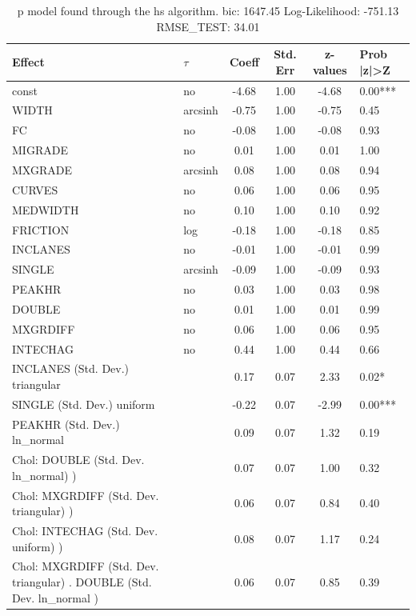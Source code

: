 \begin{table}
	\caption{p model found through the hs algorithm. bic: 1647.45 Log-Likelihood: -751.13 RMSE_TEST: 34.01}
	\begin{center}
		\begin{tabular}{|l|l|c|c|c|l|}
			\hline
			Effect & $\tau$ & Coeff & Std. Err & z-values & Prob |z|>Z \\
			\hline
			const & no & -4.68 & 1.00 & -4.68 & 0.00*** \\
			\hline
			WIDTH & arcsinh & -0.75 & 1.00 & -0.75 & 0.45 \\
			\hline
			FC & no & -0.08 & 1.00 & -0.08 & 0.93 \\
			\hline
			MIGRADE & no & 0.01 & 1.00 & 0.01 & 1.00 \\
			\hline
			MXGRADE & arcsinh & 0.08 & 1.00 & 0.08 & 0.94 \\
			\hline
			CURVES & no & 0.06 & 1.00 & 0.06 & 0.95 \\
			\hline
			MEDWIDTH & no & 0.10 & 1.00 & 0.10 & 0.92 \\
			\hline
			FRICTION & log & -0.18 & 1.00 & -0.18 & 0.85 \\
			\hline
			INCLANES & no & -0.01 & 1.00 & -0.01 & 0.99 \\
			\hline
			SINGLE & arcsinh & -0.09 & 1.00 & -0.09 & 0.93 \\
			\hline
			PEAKHR & no & 0.03 & 1.00 & 0.03 & 0.98 \\
			\hline
			DOUBLE & no & 0.01 & 1.00 & 0.01 & 0.99 \\
			\hline
			MXGRDIFF & no & 0.06 & 1.00 & 0.06 & 0.95 \\
			\hline
			INTECHAG & no & 0.44 & 1.00 & 0.44 & 0.66 \\
			\hline
			INCLANES (Std. Dev.) triangular &  & 0.17 & 0.07 & 2.33 & 0.02* \\
			\hline
			SINGLE (Std. Dev.) uniform &  & -0.22 & 0.07 & -2.99 & 0.00*** \\
			\hline
			PEAKHR (Std. Dev.) ln_normal &  & 0.09 & 0.07 & 1.32 & 0.19 \\
			\hline
			 Chol: DOUBLE (Std. Dev. ln_normal) ) &  & 0.07 & 0.07 & 1.00 & 0.32 \\
			\hline
			 Chol: MXGRDIFF (Std. Dev. triangular) ) &  & 0.06 & 0.07 & 0.84 & 0.40 \\
			\hline
			 Chol: INTECHAG (Std. Dev. uniform) ) &  & 0.08 & 0.07 & 1.17 & 0.24 \\
			\hline
			 Chol: MXGRDIFF (Std. Dev. triangular) . DOUBLE (Std. Dev.   ln_normal ) &  & 0.06 & 0.07 & 0.85 & 0.39 \\

\end{tabular}
\end{center}
\end{table}

